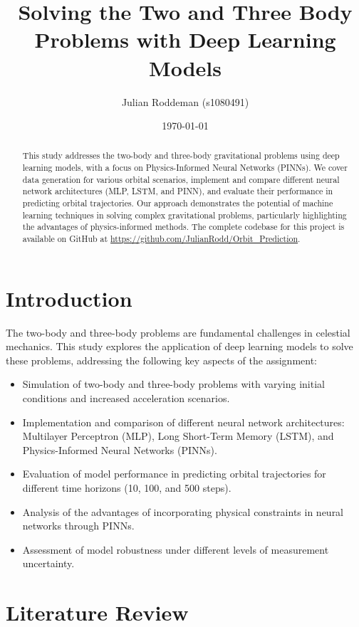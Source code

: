 \documentclass[12pt,a4paper]{article}
\title{Solving the Two and Three Body Problems with Deep Learning Models}
\author{Julian Roddeman (s1080491)}
\date{\today}
\begin{document}
\maketitle

\begin{abstract}
  This study addresses the two-body and three-body gravitational problems using deep learning models, with a focus on Physics-Informed Neural Networks (PINNs). We cover data generation for various orbital scenarios, implement and compare different neural network architectures (MLP, LSTM, and PINN), and evaluate their performance in predicting orbital trajectories. Our approach demonstrates the potential of machine learning techniques in solving complex gravitational problems, particularly highlighting the advantages of physics-informed methods. The complete codebase for this project is available on GitHub at \url{https://github.com/JulianRodd/Orbit_Prediction}.
  \end{abstract}

  \section{Introduction}
  \label{sec:introduction}
  The two-body and three-body problems are fundamental challenges in celestial mechanics. This study explores the application of deep learning models to solve these problems, addressing the following key aspects of the assignment:

  \begin{itemize}
      \item Simulation of two-body and three-body problems with varying initial conditions and increased acceleration scenarios.
      \item Implementation and comparison of different neural network architectures: Multilayer Perceptron (MLP), Long Short-Term Memory (LSTM), and Physics-Informed Neural Networks (PINNs).
      \item Evaluation of model performance in predicting orbital trajectories for different time horizons (10, 100, and 500 steps).
      \item Analysis of the advantages of incorporating physical constraints in neural networks through PINNs.
      \item Assessment of model robustness under different levels of measurement uncertainty.
  \end{itemize}

\section{Literature Review}
\label{sec:literature}
\end{document}
